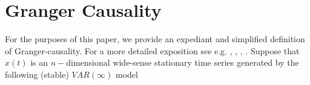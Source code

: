 \documentclass[12pt]{article}
\begin{document}


\section{Granger Causality}
\label{sec:theory}
For the purposes of this paper, we provide an expediant and simplified
definition of Granger-causality.  For a more detailed exposition see
e.g. \cite{my_GC_paper}, \cite{granger1969investigating},
\cite{geweke1982measurement}, \cite{lutkepohl2005new}.  Suppose that $x(t)$ is an
$n-$dimensional wide-sense stationary time series generated by the
following (stable) $VAR(\infty)$ model
\end{document}
